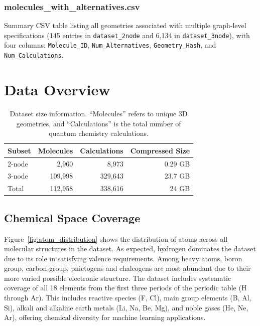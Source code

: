 \documentclass[fleqn,10pt]{article}
\begin{document}
\subsubsection*{molecules\_with\_alternatives.csv}

Summary CSV table listing all geometries associated with multiple graph-level specifications (145 entries in \texttt{dataset\_\allowbreak{}2node} and 6,134 in \texttt{dataset\_\allowbreak{}3node}), with four columns: \texttt{Molecule\_\allowbreak{}ID}, \texttt{Num\_\allowbreak{}Alternatives}, \texttt{Geometry\_\allowbreak{}Hash}, and \texttt{Num\_\allowbreak{}Calculations}.

\section*{Data Overview}

\begin{table}[ht!]
\centering
\begin{tabular}{lrrr}
\toprule
Subset & Molecules & Calculations & Compressed Size \\
\midrule
2-node & 2,960 & 8,973 & 0.29 GB \\
3-node & 109,998 & 329,643 & 23.7 GB \\
\midrule
Total & 112,958 & 338,616 & 24 GB \\
\bottomrule
\end{tabular}
\caption{Dataset size information. ``Molecules'' refers to unique 3D geometries, and ``Calculations'' is the total number of quantum chemistry calculations.}
\end{table}

\subsection*{Chemical Space Coverage}

Figure~\ref{fig:atom_distribution} shows the distribution of atoms across all molecular structures in the dataset. As expected, hydrogen dominates the dataset due to its role in satisfying valence requirements. Among heavy atoms, boron group, carbon group, pnictogens and chalcogens are most abundant due to their more varied possible electronic structure. The dataset includes systematic coverage of all 18 elements from the first three periods of the periodic table (H through Ar). This includes reactive species (F, Cl), main group elements (B, Al, Si), alkali and alkaline earth metals (Li, Na, Be, Mg), and noble gases (He, Ne, Ar), offering chemical diversity for machine learning applications.
\end{document}
